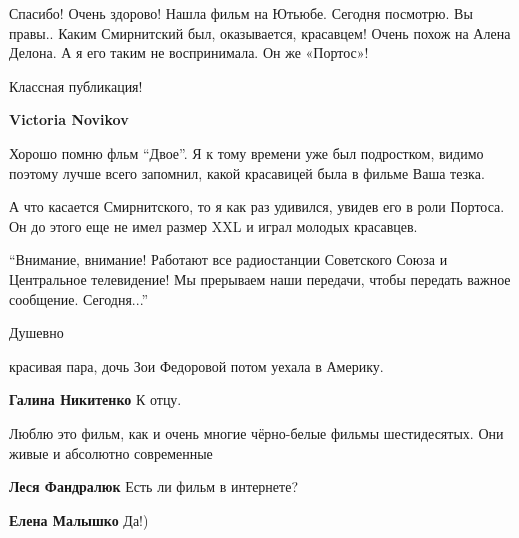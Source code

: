  
 
 
 
 
\zzSecCmt

\begin{itemize} %

Спасибо! Очень здорово! Нашла фильм на Ютьюбе. Сегодня посмотрю. Вы правы..
Каким Смирнитский был, оказывается, красавцем! Очень похож на Алена Делона. А я
его таким не воспринимала. Он же «Портос»!

Классная публикация!

\begin{itemize} %
\textbf{Victoria Novikov}

Хорошо помню фльм \enquote{Двое}. Я к тому времени уже был подростком, видимо поэтому
лучше всего запомнил, какой красавицей была в фильме Ваша тезка.

А что касается Смирнитского, то я как раз удивился, увидев его в роли Портоса.
Он до этого еще не имел размер XXL и играл молодых красавцев.

\end{itemize} %


\enquote{Внимание, внимание! Работают все радиостанции Советского Союза и Центральное
телевидение!  Мы прерываем наши передачи, чтобы передать важное сообщение.
Сегодня...}


Душевно

красивая пара, дочь Зои Федоровой потом уехала в Америку.

\textbf{Галина Никитенко} К отцу.


Люблю это фильм, как и очень многие чёрно-белые фильмы шестидесятых. Они живые
и абсолютно современные

\begin{itemize} %
\textbf{Леся Фандралюк} Есть ли фильм в интернете?

\textbf{Елена Малышко} Да!)


\end{itemize}
\end{itemize}
